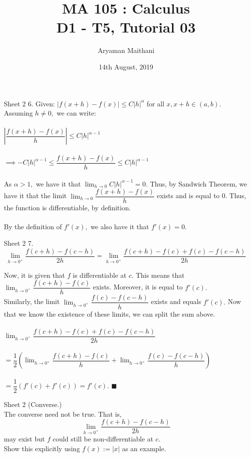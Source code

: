\documentclass[handout, aspectratio=169]{beamer}
\title{MA 105 : Calculus\\ D1 - T5, Tutorial 03}  %
\author{Aryaman Maithani}
\date[14-08-2019]{14th August, 2019}               %
\institute[IITB]{IIT Bombay}
\begin{document}
\begin{frame}
	\titlepage
\end{frame}
\begin{frame}{Sheet 2}                            %
	6. Given: $|f(x+h) - f(x)| \le C|h|^\alpha$ for all $x, x + h \in (a, b).$\\
	Assuming $h \neq 0,$ we can write:\\~\\
	$\left|\dfrac{f(x + h) - f(x)}{h}\right| \le C|h|^{\alpha-1}$\\~\\
	$\implies -C|h|^{\alpha-1} \le \dfrac{f(x + h) - f(x)}{h} \le C|h|^{\alpha-1}$\\~\\
	As $\alpha > 1,$ we have it that $\displaystyle\lim_{h\to 0}C|h|^{\alpha-1} = 0.$ Thus, by Sandwich Theorem, we have it that the limit $\displaystyle\lim_{h\to 0}\dfrac{f(x + h) - f(x)}{h}$ exists and is equal to 0. Thus, the function is differentiable, by definition.\\~\\
	By the definition of $f'(x),$ we also have it that $f'(x) = 0.$
\end{frame}
\begin{frame}{Sheet 2}
7. \[\lim_{h\to 0^+}\dfrac{f(c + h) - f(c - h)}{2h}%
		= \lim_{h\to 0^+}\dfrac{f(c + h) - f(c) + f(c) - f(c - h)}{2h}\]

Now, it is given that $f$ is differentiable at $c.$ This means that $\displaystyle\lim_{h\to 0^+}\dfrac{f(c + h) - f(c)}{h}$ exists. Moreover, it is equal to $f'(c).$\\
Similarly, the limit $\displaystyle\lim_{h\to 0^+}\dfrac{f(c) - f(c-h)}{h}$ exists and equals $f'(c).$ Now that we know the existence of these limits, we can split the sum above.\\~\\
$\displaystyle\lim_{h\to 0^+}\dfrac{f(c + h) - f(c) + f(c) - f(c - h)}{2h}$\\~\\
$=\displaystyle\dfrac{1}{2}\left(\lim_{h\to 0^+}\dfrac{f(c + h) - f(c)}{h} + \lim_{h\to 0^+}\dfrac{f(c) - f(c - h)}{h}\right)$\\~\\
$=\dfrac{1}{2}\left(f'(c) + f'(c)\right) = f'(c).$ \hfill $\blacksquare$
\end{frame}
\begin{frame}{Sheet 2}
	(Converse.)\\
	The converse need not be true. That is,
	\[\lim_{h\to 0^+}\dfrac{f(c + h) - f(c - h)}{2h}\]
	may exist but $f$ could still be non-differentiable at $c.$\\
	Show this explicitly using $f(x) := |x|$ as an example.
\end{frame}
\end{document}
